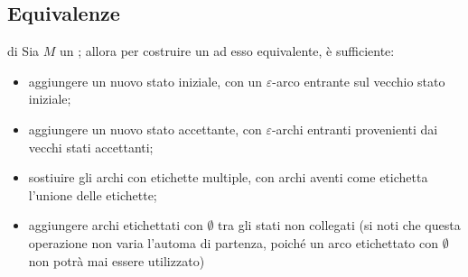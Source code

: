 \documentclass[a4paper, 12pt]{report}
\begin{document}
    \subsection{Equivalenze}

    \begin{framedmeth}[label={dfa into gnfa}]{\GNFA di \DFA}
        Sia $M$ un \DFA; allora per costruire un \GNFA ad esso equivalente, è sufficiente:

        \begin{itemize}
            \item aggiungere un nuovo stato iniziale, con un $\varepsilon$-arco entrante sul vecchio stato iniziale;
            \item aggiungere un nuovo stato accettante, con $\varepsilon$-archi entranti provenienti dai vecchi stati accettanti;
            \item sostiuire gli archi con etichette multiple, con archi aventi come etichetta l'unione delle etichette;
            \item aggiungere archi etichettati con $\emptyset$ tra gli stati non collegati (si noti che questa operazione non varia l'automa di partenza, poiché un arco etichettato con $\emptyset$ non potrà mai essere utilizzato)
        \end{itemize}
    \end{framedmeth}
\end{document}
